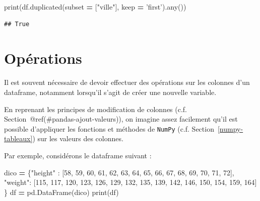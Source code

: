 \documentclass[12pt,]{book}
\newenvironment{Shaded}{\begin{snugshade}}{\end{snugshade}}
\newcommand{\DecValTok}[1]{\textcolor[rgb]{0.00,0.00,0.81}{#1}}
\newcommand{\StringTok}[1]{\textcolor[rgb]{0.31,0.60,0.02}{#1}}
\newcommand{\OperatorTok}[1]{\textcolor[rgb]{0.81,0.36,0.00}{\textbf{#1}}}
\newcommand{\BuiltInTok}[1]{#1}
\newcommand{\NormalTok}[1]{#1}
\numberwithin{equation}{section}
\numberwithin{countremarque}{section}
\begin{document}
\begin{Shaded}
\begin{Highlighting}[]
\BuiltInTok{print}\NormalTok{(df.duplicated(subset }\OperatorTok{=}\NormalTok{ [}\StringTok{"ville"}\NormalTok{], keep }\OperatorTok{=} \StringTok{'first'}\NormalTok{).}\BuiltInTok{any}\NormalTok{())}
\end{Highlighting}
\end{Shaded}

\begin{lstlisting}
## True
\end{lstlisting}

\section{Opérations}\label{operations}

Il est souvent nécessaire de devoir effectuer des opérations sur les
colonnes d'un dataframe, notamment lorsqu'il s'agit de créer une
nouvelle variable.

En reprenant les principes de modification de colonnes (c.f.
Section~@ref(\#pandas-ajout-valeurs)), on imagine assez facilement qu'il
est possible d'appliquer les fonctions et méthodes de \texttt{NumPy}
(c.f. Section~\ref{numpy-tableaux}) sur les valeurs des colonnes.

Par exemple, considérons le dataframe suivant :

\begin{Shaded}
\begin{Highlighting}[]
\NormalTok{dico }\OperatorTok{=}\NormalTok{ \{}\StringTok{"height"}\NormalTok{ : }
\NormalTok{               [}\DecValTok{58}\NormalTok{, }\DecValTok{59}\NormalTok{, }\DecValTok{60}\NormalTok{, }\DecValTok{61}\NormalTok{, }\DecValTok{62}\NormalTok{,}
                \DecValTok{63}\NormalTok{, }\DecValTok{64}\NormalTok{, }\DecValTok{65}\NormalTok{, }\DecValTok{66}\NormalTok{, }\DecValTok{67}\NormalTok{,}
                \DecValTok{68}\NormalTok{, }\DecValTok{69}\NormalTok{, }\DecValTok{70}\NormalTok{, }\DecValTok{71}\NormalTok{, }\DecValTok{72}\NormalTok{],}
        \StringTok{"weight"}\NormalTok{: }
\NormalTok{               [}\DecValTok{115}\NormalTok{, }\DecValTok{117}\NormalTok{, }\DecValTok{120}\NormalTok{, }\DecValTok{123}\NormalTok{, }\DecValTok{126}\NormalTok{,}
                \DecValTok{129}\NormalTok{, }\DecValTok{132}\NormalTok{, }\DecValTok{135}\NormalTok{, }\DecValTok{139}\NormalTok{, }\DecValTok{142}\NormalTok{,}
                \DecValTok{146}\NormalTok{, }\DecValTok{150}\NormalTok{, }\DecValTok{154}\NormalTok{, }\DecValTok{159}\NormalTok{, }\DecValTok{164}\NormalTok{]}
\NormalTok{       \} }
\NormalTok{df }\OperatorTok{=}\NormalTok{ pd.DataFrame(dico)}
\BuiltInTok{print}\NormalTok{(df)}
\end{Highlighting}
\end{Shaded}
\end{document}
